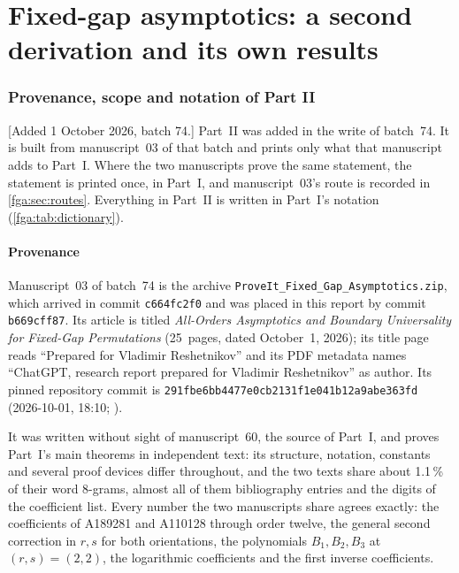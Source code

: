 \documentclass[11pt]{article}
\numberwithin{equation}{section}
\theoremstyle{definition}
\theoremstyle{remark}
\theoremstyle{definition}
\begin{document}
\part{Fixed-gap asymptotics: a second derivation and its own results}
\label{fga:part}

\section{Provenance, scope and notation of Part II}
\label{fga:sec:front}

[Added 1 October 2026, batch 74.] Part~II was added in the write of
batch~74. It is built from manuscript~03 of that batch and prints only what
that manuscript adds to Part~I. Where the two manuscripts prove the same
statement, the statement is printed once, in Part~I, and manuscript~03's
route is recorded in \cref{fga:sec:routes}. Everything in Part~II is
written in Part~I's notation (\cref{fga:tab:dictionary}).

\subsection{Provenance}
\label{fga:sec:provenance}

Manuscript~03 of batch~74 is the archive
\nolinkurl{ProveIt_Fixed_Gap_Asymptotics.zip}, which arrived in commit
\texttt{c664fc2f0} and was placed in this report by commit
\texttt{b669cff87}. Its article is titled \emph{All-Orders Asymptotics and
Boundary Universality for Fixed-Gap Permutations} (25~pages, dated
October~1, 2026); its title page reads ``Prepared for Vladimir
Reshetnikov'' and its PDF metadata names ``ChatGPT, research report
prepared for Vladimir Reshetnikov'' as author. Its pinned repository commit
is \texttt{291fbe6bb4477e0cb2131f1e041b12a9abe363fd} (2026-10-01, 18:10;
\cite{fgaProveIt}).

It was written without sight of manuscript~60, the source of Part~I, and
proves Part~I's main theorems in independent text: its structure,
notation, constants and several proof devices differ throughout, and the
two texts share about 1.1\,\% of their word 8-grams, almost all of them
bibliography entries and the digits of the coefficient list. Every number
the two manuscripts share agrees exactly: the coefficients of A189281 and
A110128 through order twelve, the general second correction in $r,s$ for
both orientations, the polynomials $B_1,B_2,B_3$ at $(r,s)=(2,2)$, the
logarithmic coefficients and the first inverse coefficients.
\end{document}
